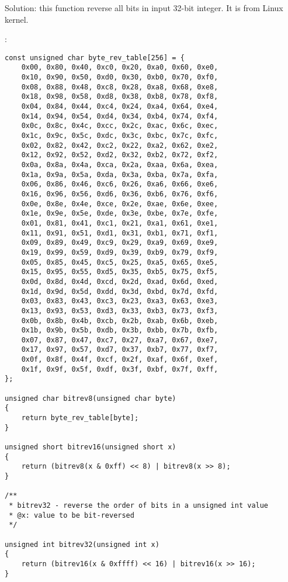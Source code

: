 {Solution: this function reverse all bits in input 32-bit integer. 
It is  from Linux kernel.}

:

\begin{lstlisting}
const unsigned char byte_rev_table[256] = {
	0x00, 0x80, 0x40, 0xc0, 0x20, 0xa0, 0x60, 0xe0,
	0x10, 0x90, 0x50, 0xd0, 0x30, 0xb0, 0x70, 0xf0,
	0x08, 0x88, 0x48, 0xc8, 0x28, 0xa8, 0x68, 0xe8,
	0x18, 0x98, 0x58, 0xd8, 0x38, 0xb8, 0x78, 0xf8,
	0x04, 0x84, 0x44, 0xc4, 0x24, 0xa4, 0x64, 0xe4,
	0x14, 0x94, 0x54, 0xd4, 0x34, 0xb4, 0x74, 0xf4,
	0x0c, 0x8c, 0x4c, 0xcc, 0x2c, 0xac, 0x6c, 0xec,
	0x1c, 0x9c, 0x5c, 0xdc, 0x3c, 0xbc, 0x7c, 0xfc,
	0x02, 0x82, 0x42, 0xc2, 0x22, 0xa2, 0x62, 0xe2,
	0x12, 0x92, 0x52, 0xd2, 0x32, 0xb2, 0x72, 0xf2,
	0x0a, 0x8a, 0x4a, 0xca, 0x2a, 0xaa, 0x6a, 0xea,
	0x1a, 0x9a, 0x5a, 0xda, 0x3a, 0xba, 0x7a, 0xfa,
	0x06, 0x86, 0x46, 0xc6, 0x26, 0xa6, 0x66, 0xe6,
	0x16, 0x96, 0x56, 0xd6, 0x36, 0xb6, 0x76, 0xf6,
	0x0e, 0x8e, 0x4e, 0xce, 0x2e, 0xae, 0x6e, 0xee,
	0x1e, 0x9e, 0x5e, 0xde, 0x3e, 0xbe, 0x7e, 0xfe,
	0x01, 0x81, 0x41, 0xc1, 0x21, 0xa1, 0x61, 0xe1,
	0x11, 0x91, 0x51, 0xd1, 0x31, 0xb1, 0x71, 0xf1,
	0x09, 0x89, 0x49, 0xc9, 0x29, 0xa9, 0x69, 0xe9,
	0x19, 0x99, 0x59, 0xd9, 0x39, 0xb9, 0x79, 0xf9,
	0x05, 0x85, 0x45, 0xc5, 0x25, 0xa5, 0x65, 0xe5,
	0x15, 0x95, 0x55, 0xd5, 0x35, 0xb5, 0x75, 0xf5,
	0x0d, 0x8d, 0x4d, 0xcd, 0x2d, 0xad, 0x6d, 0xed,
	0x1d, 0x9d, 0x5d, 0xdd, 0x3d, 0xbd, 0x7d, 0xfd,
	0x03, 0x83, 0x43, 0xc3, 0x23, 0xa3, 0x63, 0xe3,
	0x13, 0x93, 0x53, 0xd3, 0x33, 0xb3, 0x73, 0xf3,
	0x0b, 0x8b, 0x4b, 0xcb, 0x2b, 0xab, 0x6b, 0xeb,
	0x1b, 0x9b, 0x5b, 0xdb, 0x3b, 0xbb, 0x7b, 0xfb,
	0x07, 0x87, 0x47, 0xc7, 0x27, 0xa7, 0x67, 0xe7,
	0x17, 0x97, 0x57, 0xd7, 0x37, 0xb7, 0x77, 0xf7,
	0x0f, 0x8f, 0x4f, 0xcf, 0x2f, 0xaf, 0x6f, 0xef,
	0x1f, 0x9f, 0x5f, 0xdf, 0x3f, 0xbf, 0x7f, 0xff,
};

unsigned char bitrev8(unsigned char byte)
{
	return byte_rev_table[byte];
}

unsigned short bitrev16(unsigned short x)
{
	return (bitrev8(x & 0xff) << 8) | bitrev8(x >> 8);
}

/**
 * bitrev32 - reverse the order of bits in a unsigned int value
 * @x: value to be bit-reversed
 */

unsigned int bitrev32(unsigned int x)
{
	return (bitrev16(x & 0xffff) << 16) | bitrev16(x >> 16);
}
\end{lstlisting}

